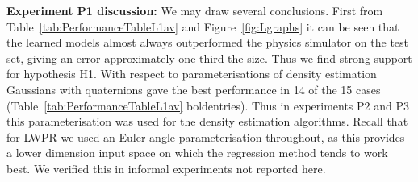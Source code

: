 
{\bf Experiment P1 discussion:} We may draw several conclusions. First
from Table~\ref{tab:PerformanceTableL1av} and Figure~\ref{fig:Lgraphs}
it can be seen that the learned models almost always outperformed the
physics simulator on the test set, giving an error approximately one
third the size. Thus we find strong support for hypothesis H1. With respect to parameterisations of density estimation Gaussians with quaternions gave the best performance in 14 of the 15 cases  (Table~\ref{tab:PerformanceTableL1av} boldentries). Thus in experiments P2 and P3 this parameterisation was used
for the density estimation algorithms.
Recall that for LWPR we used an Euler angle parameterisation throughout, as this
provides a lower dimension input space on which the regression method
tends to work best. We verified this in informal experiments not reported here.

